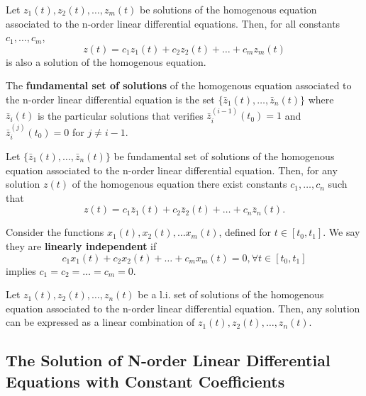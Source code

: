 \begin{theorem}
    Let \(z_{1}(t), z_{2}(t), \ldots , z_{m}(t)\) be solutions of the homogenous equation associated to the n-order linear differential equations. Then, for all constants \(c_{1}, \ldots , c_{m}\),
    \[
        z(t) = c_{1}z_{1}(t) + c_{2}z_{2}(t) + \dots + c_{m}z_{m}(t)
    \]
    is also a solution of the homogenous equation.
\end{theorem}

\begin{definition}
    The \textbf{fundamental set of solutions} of the homogenous equation associated to the n-order linear differential equation is the set \(\{\bar{z}_{1}(t), \ldots , \bar{z}_{n}(t)\}\) where \(\bar{z}_{i}(t)\) is the particular solutions that verifies \(\bar{z}_{i}^{(i - 1)}(t_{0}) = 1\) and \(\bar{z}_{i}^{(j)}(t_{0}) = 0\) for \(j \neq i - 1\).
\end{definition}

\begin{definition}
    Let \(\{\bar{z}_{1}(t),\dots,\bar{z}_{n}(t)\}\) be
    fundamental set of solutions of the homogenous equation associated to the n-order linear differential equation. Then, for any solution \(z(t)\) of the homogenous equation there exist constants \(c_{1},\ldots ,c_{n}\) such that
    \[
        z(t) = c_{1}\bar{z}_{1}(t) + c_{2}\bar{z}_{2}(t) + \dots +c_{n}\bar{z}_{n}(t).
    \]
\end{definition}

\begin{definition}
    Consider the functions \(x_{1}(t),x_{2}(t),\ldots x_{m}(t)\), defined for \(t\in [t_{0},t_{1}]\). We say they are \textbf{linearly independent} if
    \[
        c_{1}x_{1}(t) + c_{2}x_{2}(t) + \dots +c_{m}x_{m}(t) = 0, \forall t\in [t_{0},t_{1}]
    \]
    implies \(c_{1} = c_{2} = \dots = c_{m} = 0\).
\end{definition}


\begin{theorem}
    Let \(z_{1}(t), z_{2}(t), \ldots , z_{n}(t)\) be a l.i. set of solutions of the homogenous equation associated to the n-order linear differential equation. Then, any solution can be expressed as a linear combination of \(z_{1}(t), z_{2}(t), \ldots , z_{n}(t)\).
\end{theorem}

\subsection{The Solution of N-order Linear Differential Equations with Constant Coefficients}

